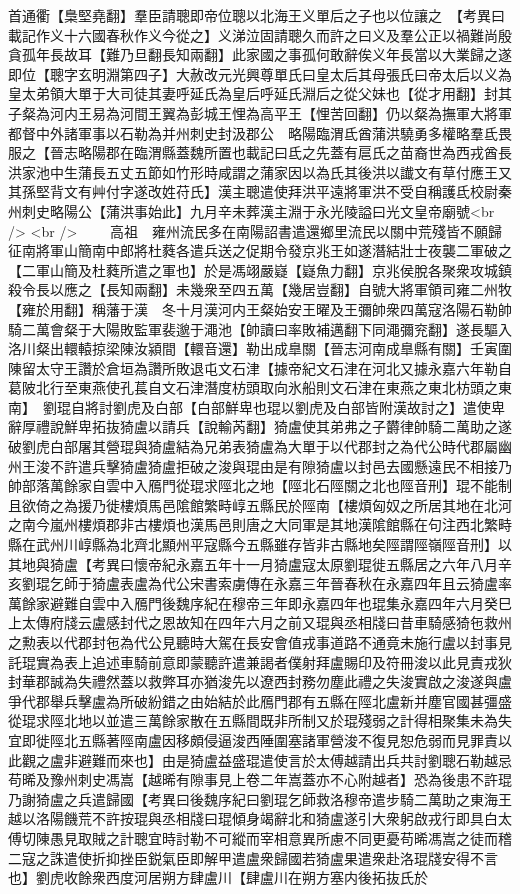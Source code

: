 首通衢【梟堅堯翻】羣臣請聰即帝位聰以北海王义單后之子也以位讓之　【考異曰載記作义十六國春秋作义今從之】义涕泣固請聰久而許之曰义及羣公正以禍難尚殷貪孤年長故耳【難乃旦翻長知兩翻】此家國之事孤何敢辭俟义年長當以大業歸之遂即位【聰字玄明淵第四子】大赦改元光興尊單氏曰皇太后其母張氏曰帝太后以义為皇太弟領大單于大司徒其妻呼延氏為皇后呼延氏淵后之從父妹也【從才用翻】封其子粲為河内王易為河間王翼為彭城王悝為高平王【悝苦回翻】仍以粲為撫軍大將軍都督中外諸軍事以石勒為并州刺史封汲郡公　略陽臨渭氐酋蒲洪驍勇多權略羣氐畏服之【晉志略陽郡在臨渭縣蓋魏所置也載記曰氐之先蓋有扈氏之苗裔世為西戎酋長洪家池中生蒲長五丈五節如竹形時咸謂之蒲家因以為氏其後洪以䜟文有草付應王又其孫堅背文有艸付字遂改姓苻氏】漢主聰遣使拜洪平遠將軍洪不受自稱護氐校尉秦州刺史略陽公【蒲洪事始此】九月辛未葬漢主淵于永光陵謚曰光文皇帝廟號<br />
<br />
　　高祖　雍州流民多在南陽詔書遣還鄉里流民以關中荒殘皆不願歸征南將軍山簡南中郎將杜蕤各遣兵送之促期令發京兆王如遂潛結壯士夜襲二軍破之【二軍山簡及杜蕤所遣之軍也】於是馮翊嚴嶷【嶷魚力翻】京兆侯脫各聚衆攻城鎮殺令長以應之【長知兩翻】未幾衆至四五萬【幾居豈翻】自號大將軍領司雍二州牧【雍於用翻】稱藩于漢　冬十月漢河内王粲始安王曜及王彌帥衆四萬寇洛陽石勒帥騎二萬會粲于大陽敗監軍裴邈于澠池【帥讀曰率敗補邁翻下同澠彌兖翻】遂長驅入洛川粲出轘轅掠梁陳汝潁間【轘音還】勒出成臯關【晉志河南成臯縣有關】壬寅圍陳留太守王讚於倉垣為讚所敗退屯文石津【據帝紀文石津在河北又據永嘉六年勒自葛陂北行至東燕使孔萇自文石津潛度枋頭取向氷船則文石津在東燕之東北枋頭之東南】　劉琨自將討劉虎及白部【白部鮮卑也琨以劉虎及白部皆附漢故討之】遣使卑辭厚禮說鮮卑拓抜猗盧以請兵【說輸芮翻】猗盧使其弟弗之子欝律帥騎二萬助之遂破劉虎白部屠其營琨與猗盧結為兄弟表猗盧為大單于以代郡封之為代公時代郡屬幽州王浚不許遣兵擊猗盧猗盧拒破之浚與琨由是有隙猗盧以封邑去國懸遠民不相接乃帥部落萬餘家自雲中入鴈門從琨求陘北之地【陘北石陘關之北也陘音刑】琨不能制且欲倚之為援乃徙樓煩馬邑隂館繁畤崞五縣民於陘南【樓煩匈奴之所居其地在北河之南今嵐州樓煩郡非古樓煩也漢馬邑則唐之大同軍是其地漢隂館縣在句注西北繁畤縣在武州川崞縣為北齊北顯州平寇縣今五縣雖存皆非古縣地矣陘謂陘嶺陘音刑】以其地與猗盧【考異曰懷帝紀永嘉五年十一月猗盧寇太原劉琨徙五縣居之六年八月辛亥劉琨乞師于猗盧表盧為代公宋書索虜傳在永嘉三年晉春秋在永嘉四年且云猗盧率萬餘家避難自雲中入鴈門後魏序紀在穆帝三年即永嘉四年也琨集永嘉四年六月癸巳上太傳府牋云盧感封代之恩故知在四年六月之前又琨與丞相牋曰昔車騎感猗㐌救州之勲表以代郡封㐌為代公見聽時大駕在長安會值戎事道路不通竟未施行盧以封事見託琨實為表上追述車騎前意即蒙聽許遣兼謁者僕射拜盧賜印及符冊浚以此見責戎狄封華郡誠為失禮然蓋以救弊耳亦猶浚先以遼西封務勿塵此禮之失浚實啟之浚遂與盧爭代郡舉兵擊盧為所破紛錯之由始結於此鴈門郡有五縣在陘北盧新并塵官國甚彊盛從琨求陘北地以並遣三萬餘家散在五縣間既非所制又於琨殘弱之計得相聚集未為失宜即徙陘北五縣著陘南盧因移頗侵逼浚西陲圍塞諸軍營浚不復見恕危弱而見罪責以此觀之盧非避難而來也】由是猗盧益盛琨遣使言於太傅越請出兵共討劉聰石勒越忌苟晞及豫州刺史馮嵩【越晞有隙事見上卷二年嵩蓋亦不心附越者】恐為後患不許琨乃謝猗盧之兵遣歸國【考異曰後魏序紀曰劉琨乞師救洛穆帝遣步騎二萬助之東海王越以洛陽饑荒不許按琨與丞相牋曰琨傾身竭辭北和猗盧遂引大衆躬啟戎行即具白太傅切陳愚見取賊之計聰宜時討勒不可縱而宰相意異所慮不同更憂苟晞馮嵩之徒而稽二寇之誅遣使折抑挫臣鋭氣臣即解甲遣盧衆歸國若猗盧果遣衆赴洛琨牋安得不言也】劉虎收餘衆西度河居朔方肆盧川【肆盧川在朔方塞内後拓抜氏於